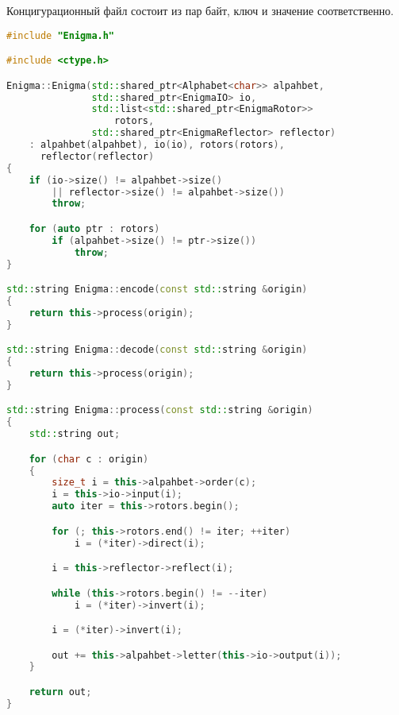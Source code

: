 Концигурационный файл состоит из пар байт, ключ и значение соответственно.

\clearpage

\begin{lstlisting}[language=c++, caption={Класс, описывающий машину}]
#include "Enigma.h"

#include <ctype.h>

Enigma::Enigma(std::shared_ptr<Alphabet<char>> alpahbet,
               std::shared_ptr<EnigmaIO> io,
               std::list<std::shared_ptr<EnigmaRotor>>
                   rotors,
               std::shared_ptr<EnigmaReflector> reflector)
    : alpahbet(alpahbet), io(io), rotors(rotors),
      reflector(reflector)
{
    if (io->size() != alpahbet->size()
        || reflector->size() != alpahbet->size())
        throw;

    for (auto ptr : rotors)
        if (alpahbet->size() != ptr->size())
            throw;
}

std::string Enigma::encode(const std::string &origin)
{
    return this->process(origin);
}

std::string Enigma::decode(const std::string &origin)
{
    return this->process(origin);
}

std::string Enigma::process(const std::string &origin)
{
    std::string out;

    for (char c : origin)
    {
        size_t i = this->alpahbet->order(c);
        i = this->io->input(i);
        auto iter = this->rotors.begin();

        for (; this->rotors.end() != iter; ++iter)
            i = (*iter)->direct(i);

        i = this->reflector->reflect(i);

        while (this->rotors.begin() != --iter)
            i = (*iter)->invert(i);

        i = (*iter)->invert(i);

        out += this->alpahbet->letter(this->io->output(i));
    }

    return out;
}
\end{lstlisting}

